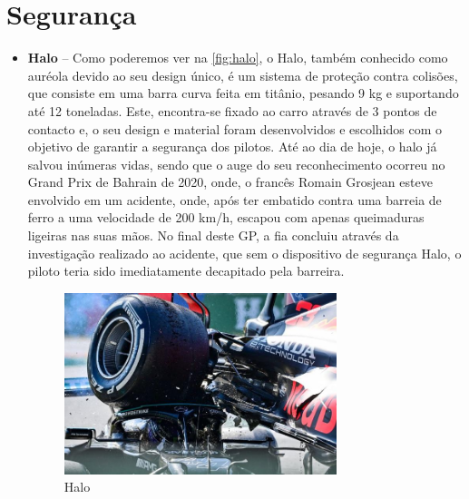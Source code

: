 \documentclass{report}
\begin{document}
\section{Segurança}	

\begin{itemize}

\item \textbf{Halo} – Como poderemos ver na \autoref{fig:halo}, o Halo, também conhecido como auréola devido ao seu design único, é um sistema de proteção contra colisões, que consiste em uma barra curva feita em titânio, pesando 9 kg e suportando até 12 toneladas. Este, encontra-se fixado ao carro através de 3 pontos de contacto e, o seu design e material foram desenvolvidos e escolhidos com o objetivo de garantir a segurança dos pilotos. Até ao dia de hoje, o halo já salvou inúmeras vidas, sendo que o auge do seu reconhecimento ocorreu no Grand Prix de Bahrain de 2020, onde, o francês Romain Grosjean esteve envolvido em um acidente, onde, após ter embatido contra uma barreia de ferro a uma velocidade de 200 km/h, escapou com apenas queimaduras ligeiras nas suas mãos. 
No final deste GP, a \ac{fia} concluiu através da investigação realizado ao acidente, que sem o dispositivo de segurança Halo, o piloto teria sido imediatamente decapitado pela barreira.
\begin{figure}[h]
\center %
\includegraphics[height=150pt]{halo}
\caption{Halo}
\label{fig:halo}
\end{figure}


\end{itemize}
\end{document}
